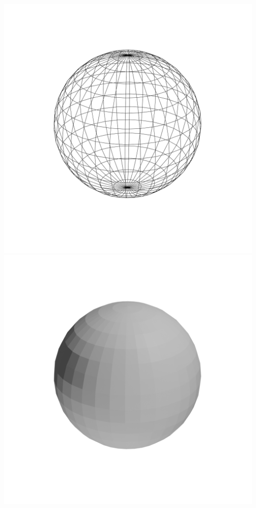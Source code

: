 \documentclass[11pt,class=report,crop=false]{standalone}
\begin{document}
\begin{center}
\includegraphics[scale=\myscale,scale=0.15,trim={3cm 7cm 3cm  7cm},clip]{figures/texture-sphere-frame}
\includegraphics[scale=\myscale,scale=0.15,trim={3cm 7cm 3cm 7cm},clip]{figures/texture-sphere-flat}

\end{center}
\end{document}
